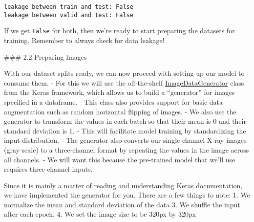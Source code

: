 \documentclass[11pt]{article}
\begin{document}
    \begin{Verbatim}[commandchars=\\\{\}]
leakage between train and test: False
leakage between valid and test: False

    \end{Verbatim}

    If we get \texttt{False} for both, then we're ready to start preparing
the datasets for training. Remember to always check for data leakage!

     \#\#\# 2.2 Preparing Images

    With our dataset splits ready, we can now proceed with setting up our
model to consume them. - For this we will use the off-the-shelf
\href{https://keras.io/preprocessing/image/}{ImageDataGenerator} class
from the Keras framework, which allows us to build a ``generator'' for
images specified in a dataframe. - This class also provides support for
basic data augmentation such as random horizontal flipping of images. -
We also use the generator to transform the values in each batch so that
their mean is \(0\) and their standard deviation is 1. - This will
facilitate model training by standardizing the input distribution. - The
generator also converts our single channel X-ray images (gray-scale) to
a three-channel format by repeating the values in the image across all
channels. - We will want this because the pre-trained model that we'll
use requires three-channel inputs.

Since it is mainly a matter of reading and understanding Keras
documentation, we have implemented the generator for you. There are a
few things to note: 1. We normalize the mean and standard deviation of
the data 3. We shuffle the input after each epoch. 4. We set the image
size to be 320px by 320px
\end{document}
